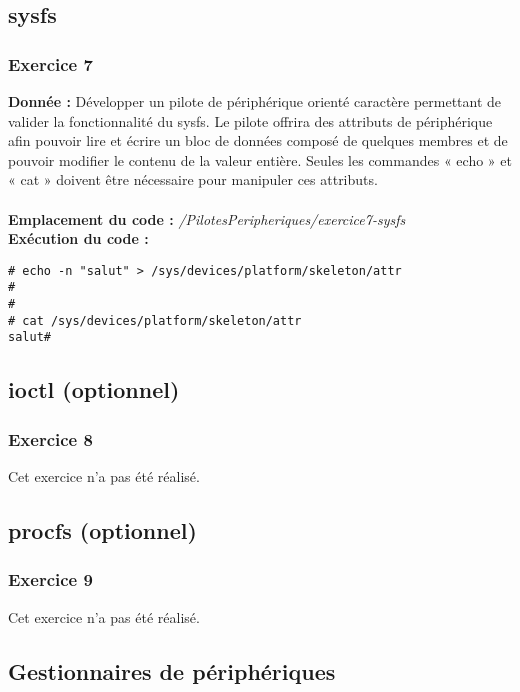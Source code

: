 \subsection{sysfs}
\subsubsection{Exercice 7}
\textbf{Donnée : } Développer	un	pilote	de	périphérique	orienté	caractère	permettant	de	valider	la	fonctionnalité	du	
sysfs.	Le	pilote		offrira	des	attributs	de	périphérique	afin	pouvoir	lire	et	écrire	un	bloc	de	données	
composé	de	quelques	membres	et	de	pouvoir	modifier	le	contenu	de	la	valeur	entière.	Seules	les	
commandes	« echo » et	« cat » doivent	être	nécessaire	pour	manipuler	ces	attributs.\\\\

\textbf{Emplacement du code : } \textit{/PilotesPeripheriques/exercice7-sysfs}\\


\textbf{Exécution du code : } \\
\begin{lstlisting}
# echo -n "salut" > /sys/devices/platform/skeleton/attr 
# 
# 
# cat /sys/devices/platform/skeleton/attr 
salut# 
\end{lstlisting}

\subsection{ioctl (optionnel)}
\subsubsection{Exercice 8}
Cet exercice n'a pas été réalisé.

\subsection{procfs (optionnel)}
\subsubsection{Exercice 9}
Cet exercice n'a pas été réalisé.

\color{red}
\subsection{Gestionnaires de périphériques}
